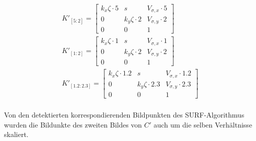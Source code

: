 \begin{gather*}
K'_{[5:2]}=	
\begin{bmatrix}
k_x\zeta \cdot 5 &s&V_{\sigma,x} \cdot 5\\
0&k_y\zeta \cdot 2&V_{\sigma,y} \cdot 2\\
0&0&1
\end{bmatrix}\\
K'_{[1:2]}=	
\begin{bmatrix}
k_x\zeta \cdot 1 &s&V_{\sigma,x} \cdot 1\\
0&k_y\zeta\cdot 2&V_{\sigma,y} \cdot 2\\
0&0&1
\end{bmatrix}\\
K'_{[1.2:2.3]}=	
\begin{bmatrix}
k_x\zeta \cdot 1.2 &s&V_{\sigma,x} \cdot 1.2\\
0&k_y\zeta \cdot 2.3&V_{\sigma,y} \cdot 2.3\\
0&0&1
\end{bmatrix}\\
\end{gather*}


Von den detektierten korrespondierenden Bildpunkten des SURF-Algorithmus wurden die Bildunkte des zweiten Bildes von $C'$ auch um die selben Verhältnisse skaliert.

